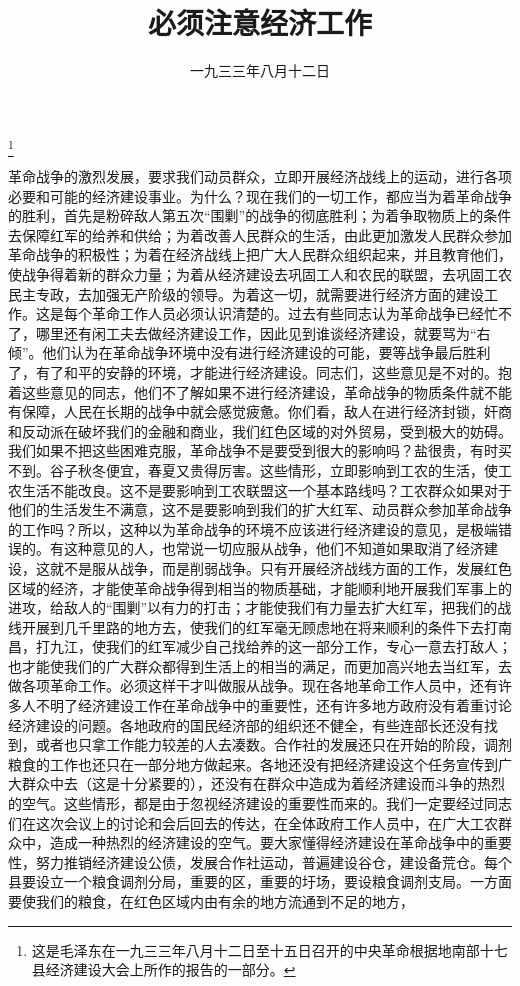 
\title{必须注意经济工作}
\date{一九三三年八月十二日}
\thanks{这是毛泽东在一九三三年八月十二日至十五日召开的中央革命根据地南部十七县经济建设大会上所作的报告的一部分。}
\maketitle


革命战争的激烈发展，要求我们动员群众，立即开展经济战线上的运动，进行各项必要和可能的经济建设事业。为什么？现在我们的一切工作，都应当为着革命战争的胜利，首先是粉碎敌人第五次“围剿”的战争的彻底胜利；为着争取物质上的条件去保障红军的给养和供给；为着改善人民群众的生活，由此更加激发人民群众参加革命战争的积极性；为着在经济战线上把广大人民群众组织起来，并且教育他们，使战争得着新的群众力量；为着从经济建设去巩固工人和农民的联盟，去巩固工农民主专政，去加强无产阶级的领导。为着这一切，就需要进行经济方面的建设工作。这是每个革命工作人员必须认识清楚的。过去有些同志认为革命战争已经忙不了，哪里还有闲工夫去做经济建设工作，因此见到谁谈经济建设，就要骂为“右倾”。他们认为在革命战争环境中没有进行经济建设的可能，要等战争最后胜利了，有了和平的安静的环境，才能进行经济建设。同志们，这些意见是不对的。抱着这些意见的同志，他们不了解如果不进行经济建设，革命战争的物质条件就不能有保障，人民在长期的战争中就会感觉疲惫。你们看，敌人在进行经济封锁，奸商和反动派在破坏我们的金融和商业，我们红色区域的对外贸易，受到极大的妨碍。我们如果不把这些困难克服，革命战争不是要受到很大的影响吗？盐很贵，有时买不到。谷子秋冬便宜，春夏又贵得厉害。这些情形，立即影响到工农的生活，使工农生活不能改良。这不是要影响到工农联盟这一个基本路线吗？工农群众如果对于他们的生活发生不满意，这不是要影响到我们的扩大红军、动员群众参加革命战争的工作吗？所以，这种以为革命战争的环境不应该进行经济建设的意见，是极端错误的。有这种意见的人，也常说一切应服从战争，他们不知道如果取消了经济建设，这就不是服从战争，而是削弱战争。只有开展经济战线方面的工作，发展红色区域的经济，才能使革命战争得到相当的物质基础，才能顺利地开展我们军事上的进攻，给敌人的“围剿”以有力的打击；才能使我们有力量去扩大红军，把我们的战线开展到几千里路的地方去，使我们的红军毫无顾虑地在将来顺利的条件下去打南昌，打九江，使我们的红军减少自己找给养的这一部分工作，专心一意去打敌人；也才能使我们的广大群众都得到生活上的相当的满足，而更加高兴地去当红军，去做各项革命工作。必须这样干才叫做服从战争。现在各地革命工作人员中，还有许多人不明了经济建设工作在革命战争中的重要性，还有许多地方政府没有着重讨论经济建设的问题。各地政府的国民经济部的组织还不健全，有些连部长还没有找到，或者也只拿工作能力较差的人去凑数。合作社的发展还只在开始的阶段，调剂粮食的工作也还只在一部分地方做起来。各地还没有把经济建设这个任务宣传到广大群众中去（这是十分紧要的），还没有在群众中造成为着经济建设而斗争的热烈的空气。这些情形，都是由于忽视经济建设的重要性而来的。我们一定要经过同志们在这次会议上的讨论和会后回去的传达，在全体政府工作人员中，在广大工农群众中，造成一种热烈的经济建设的空气。要大家懂得经济建设在革命战争中的重要性，努力推销经济建设公债，发展合作社运动，普遍建设谷仓，建设备荒仓。每个县要设立一个粮食调剂分局，重要的区，重要的圩场，要设粮食调剂支局。一方面要使我们的粮食，在红色区域内由有余的地方流通到不足的地方，
